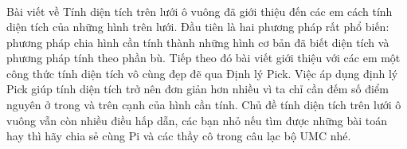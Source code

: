\begin{multicols}{2}
\begin{align*}
	\end{align*}
	Bài viết về Tính diện tích trên lưới ô vuông đã giới thiệu đến các em cách tính diện tích của những hình trên lưới. Đầu tiên là hai phương pháp rất phổ biến: phương pháp chia hình cần tính thành những hình cơ bản đã biết diện tích và phương pháp tính theo phần bù. Tiếp theo đó bài viết giới thiệu với các em một công thức tính diện tích vô cùng đẹp đẽ qua Định lý Pick. Việc áp dụng định lý Pick giúp tính diện tích trở nên đơn giản hơn nhiều vì ta chỉ cần đếm số điểm nguyên ở trong và trên cạnh của hình cần tính. Chủ đề tính diện tích trên lưới ô vuông vẫn còn nhiều điều hấp dẫn, các bạn nhỏ nếu tìm được những bài toán hay thì hãy chia sẻ cùng Pi và các thầy cô trong câu lạc bộ UMC nhé.
\end{multicols}

